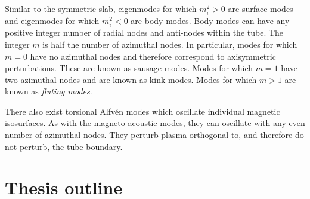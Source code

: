 Similar to the symmetric slab, eigenmodes for which $m_i^2 > 0$ are surface modes and eigenmodes for which $m_i^2 < 0$ are body modes. Body modes can have any positive integer number of radial nodes and anti-nodes within the tube. The integer $m$ is half the number of azimuthal nodes. In particular, modes for which $m = 0$ have no azimuthal nodes and therefore correspond to axisymmetric perturbations. These are known as sausage modes. Modes for which $m = 1$ have two azimuthal nodes and are known as kink modes. Modes for which $m > 1$ are known as \textit{fluting modes}.

There also exist torsional Alfv\'{e}n modes which oscillate individual magnetic isosurfaces. As with the magneto-acoustic modes, they can oscillate with any even number of azimuthal nodes. They perturb plasma orthogonal to, and therefore do not perturb, the tube boundary.


\section{Thesis outline}
\label{sec:outline}

